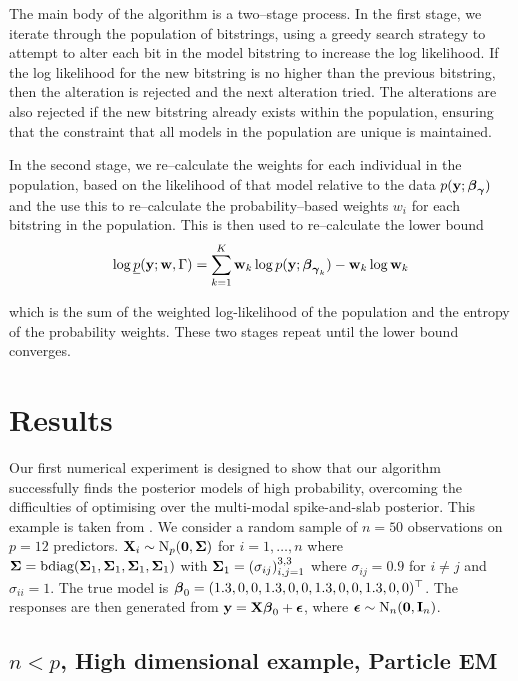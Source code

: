 The main body of the algorithm is a two--stage process. In the first stage, we iterate through the population of
bitstrings, using a greedy search strategy to attempt to alter each bit in the model bitstring to increase the log likelihood. If the log likelihood for the new bitstring is no higher than the previous bitstring, then the
alteration is rejected and the next alteration tried. The alterations are also rejected if the new bitstring
already exists within the population, ensuring that the constraint that all models in the population are
unique is maintained.

In the second stage, we re--calculate the weights for each individual in the population, based on the
likelihood of that model relative to the data $p({\bf y}; {\boldsymbol \beta}_{\boldsymbol \gamma})$ and the use this to re--calculate the
probability--based weights $w_i$ for each bitstring in the population. This is then used to re--calculate the
lower bound
\[
	\log \underline{p}({\bf y}; {\bf w}, \Gamma) = \sum_{k=1}^K {\bf w}_k \log p({\bf y}; {\boldsymbol \beta}_{{\boldsymbol \gamma}_k}) - {\bf w}_k \log {\bf w}_k
\]

which is the sum of the weighted log-likelihood of the population and the entropy of the probability weights.
These two stages repeat until the lower bound converges.

\section{Results}


Our first numerical experiment is designed to show that our algorithm successfully finds the posterior models
of high probability, overcoming the difficulties of optimising over the multi-modal spike-and-slab posterior.
This example is taken from \citep{Rockova2016}. 
We consider a random sample of $n = 50$ observations on $p = 12$ predictors. ${\bf X}_i \sim \text{N}_p({\bf 0}, {\boldsymbol \Sigma})$
for $i = 1, \ldots, n$ where
${\boldsymbol \Sigma} = \text{bdiag}({\boldsymbol \Sigma}_1, {\boldsymbol \Sigma}_1, {\boldsymbol \Sigma}_1, {\boldsymbol \Sigma}_1)$ with
${\boldsymbol \Sigma}_1 = (\sigma_{ij})_{i, j = 1}^{3, 3}$ where $\sigma_{ij} = 0.9$ for $i \ne j$ and $\sigma_{ii} = 1$.
The true model is ${\boldsymbol \beta}_0 = (1.3, 0, 0, 1.3, 0, 0, 1.3, 0, 0, 1.3, 0, 0)^\top$.
The responses are then generated from ${\bf y} = {\bf X} {\boldsymbol \beta}_0 + {\boldsymbol \epsilon}$, where
${\boldsymbol \epsilon} \sim \text{N}_n({\bf 0}, {\bf I}_n)$.

\subsection{$n < p$, High dimensional example, Particle EM}

